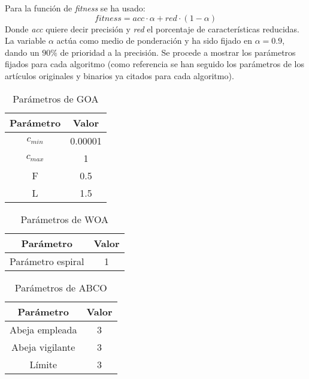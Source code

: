 Para la función de \textit{fitness} se ha usado:
\begin{equation}
    fitness = acc\cdot\alpha + red\cdot(1-\alpha)
\end{equation}
Donde \textit{acc} quiere decir precisión y \textit{red} el porcentaje de características reducidas. La variable $\alpha$ actúa como medio de ponderación y ha sido fijado en $\alpha=0.9$, dando un $90\%$ de prioridad a la precisión.
Se procede a mostrar los parámetros fijados para cada algoritmo (como referencia se han seguido los parámetros de los artículos originales y binarios ya citados para cada algoritmo).

\begin{table}[H]
    \centering
    \begin{tabular}{ c c }
        \hline
        \textbf{Parámetro} & \textbf{Valor} \\
        \hline
        $c_{min}$          & 0.00001        \\
        $c_{max}$          & 1              \\
        F                  & 0.5            \\
        L                  & 1.5            \\
        \hline
    \end{tabular}
    \caption{Parámetros de GOA}
\end{table}

\begin{table}[H]
    \centering
    \begin{tabular}{ c c }
        \hline
        \textbf{Parámetro} & \textbf{Valor} \\
        \hline
        Parámetro espiral  & 1              \\
        \hline
    \end{tabular}
    \caption{Parámetros de WOA}
\end{table}

\begin{table}[H]
    \centering
    \begin{tabular}{ c c }
        \hline
        \textbf{Parámetro} & \textbf{Valor} \\
        \hline
        Abeja empleada     & 3              \\
        Abeja vigilante    & 3              \\
        Límite             & 3              \\
        \hline
    \end{tabular}
    \caption{Parámetros de ABCO}
\end{table}

